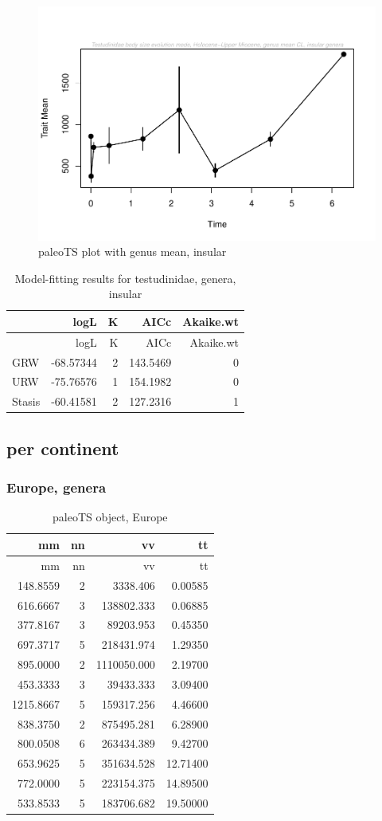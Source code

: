 \begin{figure}[H]
	\centering
	\includegraphics{MA_JJ_files/figure-latex/paleoTSI-1.pdf}
	\caption{paleoTS plot with genus mean, insular}
	\label{fig:pTSI}
\end{figure}

\begin{longtable}[]{@{}lrrrr@{}}
	\caption{Model-fitting results for testudinidae, genera,
		insular}
	\label{tab:pTSIEM}\tabularnewline
	\toprule
	& logL & K & AICc & Akaike.wt\tabularnewline
	\midrule
	\endfirsthead
	\toprule
	& logL & K & AICc & Akaike.wt\tabularnewline
	\midrule
	\endhead
	GRW & -68.57344 & 2 & 143.5469 & 0\tabularnewline
	URW & -75.76576 & 1 & 154.1982 & 0\tabularnewline
	Stasis & -60.41581 & 2 & 127.2316 & 1\tabularnewline
	\bottomrule
\end{longtable}

\FloatBarrier

\subsection{per continent}\label{per-continent}

\subsubsection{Europe, genera}\label{europe-genera}

\begin{longtable}[]{@{}rrrr@{}}
	\caption{paleoTS object, Europe}
	\label{tab:pTSEu}\tabularnewline
	\toprule
	mm & nn & vv & tt\tabularnewline
	\midrule
	\endfirsthead
	\toprule
	mm & nn & vv & tt\tabularnewline
	\midrule
	\endhead
	148.8559 & 2 & 3338.406 & 0.00585\tabularnewline
	616.6667 & 3 & 138802.333 & 0.06885\tabularnewline
	377.8167 & 3 & 89203.953 & 0.45350\tabularnewline
	697.3717 & 5 & 218431.974 & 1.29350\tabularnewline
	895.0000 & 2 & 1110050.000 & 2.19700\tabularnewline
	453.3333 & 3 & 39433.333 & 3.09400\tabularnewline
	1215.8667 & 5 & 159317.256 & 4.46600\tabularnewline
	838.3750 & 2 & 875495.281 & 6.28900\tabularnewline
	800.0508 & 6 & 263434.389 & 9.42700\tabularnewline
	653.9625 & 5 & 351634.528 & 12.71400\tabularnewline
	772.0000 & 5 & 223154.375 & 14.89500\tabularnewline
	533.8533 & 5 & 183706.682 & 19.50000\tabularnewline
	\bottomrule
\end{longtable}

